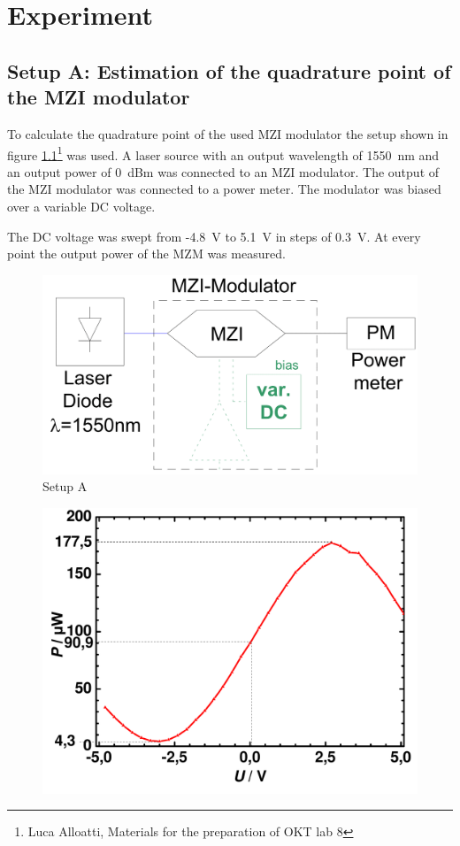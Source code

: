 \chapter{Experiment}

\section{Setup A: Estimation of the quadrature point of the MZI modulator}
To calculate the quadrature point of the used MZI modulator the setup shown in figure \ref{fig:A_setup}\footnote[3]{Luca Alloatti, Materials for the preparation of OKT lab 8} was used. A laser source with an output wavelength of 1550~nm and an output power of 0~dBm was connected to an MZI modulator. The output of the MZI modulator was connected to a power meter. The modulator was biased over a variable DC voltage.

The DC voltage was swept from -4.8~V to 5.1~V in steps of 0.3~V. At every point the output power of the MZM was measured.

\begin{figure}%
\centering
\includegraphics[width=.5\columnwidth]{Grafiken/SetupA.png}%
\caption{Setup A}%
\label{fig:A_setup}%
\end{figure}

\begin{figure}%
\centering
\includegraphics[width=.6\columnwidth]{Grafiken/A_quadratur.pdf}%
\caption{}%
\label{fig:A_quadratur}%
\end{figure}

